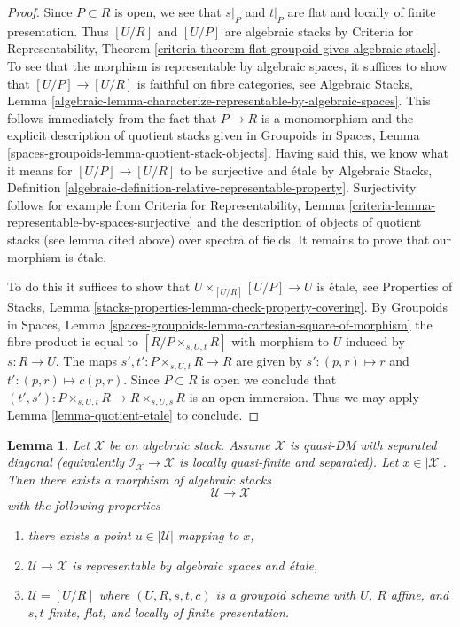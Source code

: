 \documentclass{stacks-project}
\theoremstyle{plain}
\newtheorem{lemma}[subsection]{Lemma}
\theoremstyle{definition}
\theoremstyle{remark}
\numberwithin{equation}{subsection}
\begin{document}
\begin{proof}
Since $P \subset R$ is open, we see that $s|_P$ and $t|_P$
are flat and locally of finite presentation.
Thus $[U/R]$ and $[U/P]$ are algebraic stacks by
Criteria for Representability, Theorem
\ref{criteria-theorem-flat-groupoid-gives-algebraic-stack}.
To see that the morphism is representable by algebraic spaces,
it suffices to show that $[U/P] \to [U/R]$ is faithful on
fibre categories, see
Algebraic Stacks, Lemma
\ref{algebraic-lemma-characterize-representable-by-algebraic-spaces}.
This follows immediately from the fact that $P \to R$ is a monomorphism
and the explicit description of quotient stacks given in
Groupoids in Spaces, Lemma
\ref{spaces-groupoids-lemma-quotient-stack-objects}.
Having said this, we know what it means for
$[U/P] \to [U/R]$ to be surjective and \'etale by
Algebraic Stacks, Definition
\ref{algebraic-definition-relative-representable-property}.
Surjectivity follows for example from
Criteria for Representability,
Lemma \ref{criteria-lemma-representable-by-spaces-surjective}
and the description of objects of quotient stacks
(see lemma cited above) over spectra of fields.
It remains to prove that our morphism is \'etale.

\medskip\noindent
To do this it suffices to show that $U \times_{[U/R]} [U/P] \to U$
is \'etale, see Properties of Stacks, Lemma
\ref{stacks-properties-lemma-check-property-covering}.
By Groupoids in Spaces, Lemma
\ref{spaces-groupoids-lemma-cartesian-square-of-morphism}
the fibre product is equal to $[R/P \times_{s, U, t} R]$
with morphism to $U$ induced by $s : R \to U$.
The maps $s', t' : P \times_{s, U, t} R \to R$ are given by
$s' : (p, r) \mapsto r$ and $t' : (p, r) \mapsto c(p, r)$. Since
$P \subset R$ is open we conclude that
$(t', s') : P \times_{s, U, t} R \to R \times_{s, U, s} R$
is an open immersion.
Thus we may apply Lemma \ref{lemma-quotient-etale}
to conclude.
\end{proof}

\begin{lemma}
\label{lemma-etale-local-quasi-DM}
Let $\mathcal{X}$ be an algebraic stack. Assume $\mathcal{X}$ is
quasi-DM with separated diagonal (equivalently
$\mathcal{I}_\mathcal{X} \to \mathcal{X}$ is locally quasi-finite and
separated). Let $x \in |\mathcal{X}|$. Then there exists a
morphism of algebraic stacks
$$
\mathcal{U} \longrightarrow \mathcal{X}
$$
with the following properties
\begin{enumerate}
\item there exists a point $u \in |\mathcal{U}|$ mapping to $x$,
\item $\mathcal{U} \to \mathcal{X}$ is representable by algebraic spaces and
\'etale,
\item $\mathcal{U} = [U/R]$ where $(U, R, s, t, c)$ is a groupoid
scheme with $U$, $R$ affine, and $s, t$ finite, flat, and
locally of finite presentation.
\end{enumerate}
\end{lemma}
\end{document}
